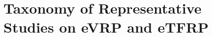 \documentclass[journal]{IEEEtran}
\begin{document}






\section{Taxonomy of Representative Studies on eVRP and eTFRP}
\end{document}
